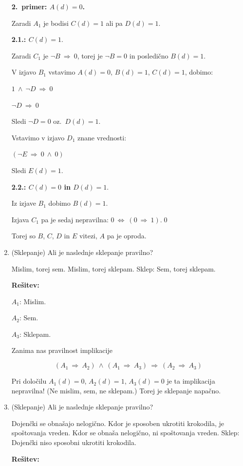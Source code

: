 \documentclass[11pt,paper=b5,footinclude,headinclude]{scrbook} %
\def\inn {{~\wedge~}}
\def\sledi {{~\Rightarrow~}}
\def\cee {{~\Leftrightarrow~}}
\begin{document}
\begin{enumerate}
\textbf{2.~primer: $A(d) = 0$.}

Zaradi $A_1$ je bodisi $C(d) = 1$ ali pa $D(d) = 1$.

\textbf{2.1.: $C(d) = 1$}.

Zaradi $C_1$ je $\neg B \sledi 0$, torej je $\neg B = 0$ in posledično $B(d) = 1$.

V izjavo $B_1$ vstavimo $A(d) = 0$, $B(d) = 1$, $C(d) = 1$, dobimo:

$1 \inn \neg D\sledi 0$

$\neg D\sledi 0$

Sledi $\neg D = 0$ oz.~$D(d) = 1$.

Vstavimo v izjavo $D_1$ znane vrednosti:

$(\neg E \sledi 0 \inn 0)$

Sledi $E(d) = 1$.

\bigskip

\textbf{2.2.: $C(d) = 0$ in $D(d) = 1$}.

Iz izjave $B_1$ dobimo $B(d) = 1$.

Izjava $C_1$ pa je sedaj nepravilna:
$0 \cee (0\sledi 1)$.\qed

Torej so $B$, $C$, $D$ in $E$ vitezi, $A$ pa je oproda.


\bigskip
\item (Sklepanje)
Ali je naslednje sklepanje pravilno?

Mislim, torej sem. Mislim, torej sklepam. Sklep: Sem, torej sklepam.


\textbf{Rešitev:}

$A_1$: Mislim.

$A_2$: Sem.

$A_3$: Sklepam.

Zanima nas pravilnost implikacije

$$(A_1\sledi A_2)\inn(A_1\sledi A_3)\sledi(A_2\sledi A_3)$$

Pri določilu $A_1(d) = 0$, $A_2(d) = 1$, $A_3(d) = 0$ je ta implikacija nepravilna!
(Ne mislim, sem, ne sklepam.)
Torej je sklepanje napačno.

\bigskip

\item (Sklepanje)
Ali je naslednje sklepanje pravilno?

Dojenčki se obnašajo nelogično. Kdor je sposoben ukrotiti krokodila, je spoštovanja vreden.
Kdor se obnaša nelogično, ni spoštovanja vreden. Sklep: Dojenčki niso sposobni ukrotiti krokodila.


\textbf{Rešitev:}


\end{enumerate}
\end{document}
